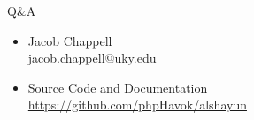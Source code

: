 \documentclass{beamer}
\begin{document}
\begin{frame}{Q\&A}
    \begin{itemize}
        \item \begin{center}
                Jacob Chappell \\
                \href{mailto:jacob.chappell@uky.edu}{jacob.chappell@uky.edu}
                \vfill
        \end{center}
        \item \begin{center}
                Source Code and Documentation \\ \url{https://github.com/phpHavok/alshayun}
        \end{center}
    \end{itemize}
\end{frame}
\end{document}
